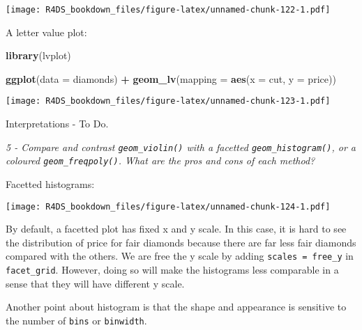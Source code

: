 \documentclass[]{article}
\newenvironment{Shaded}{\begin{snugshade}}{\end{snugshade}}
\newcommand{\KeywordTok}[1]{\textcolor[rgb]{0.13,0.29,0.53}{\textbf{#1}}}
\newcommand{\DataTypeTok}[1]{\textcolor[rgb]{0.13,0.29,0.53}{#1}}
\newcommand{\DecValTok}[1]{\textcolor[rgb]{0.00,0.00,0.81}{#1}}
\newcommand{\StringTok}[1]{\textcolor[rgb]{0.31,0.60,0.02}{#1}}
\newcommand{\OperatorTok}[1]{\textcolor[rgb]{0.81,0.36,0.00}{\textbf{#1}}}
\newcommand{\NormalTok}[1]{#1}
\theoremstyle{definition}
\theoremstyle{definition}
\theoremstyle{definition}
\theoremstyle{remark}
\begin{document}
\texttt{[image: R4DS\_bookdown\_files/figure-latex/unnamed-chunk-122-1.pdf]}

A letter value plot:

\begin{Shaded}
\begin{Highlighting}[]
\KeywordTok{library}\NormalTok{(lvplot)}

\KeywordTok{ggplot}\NormalTok{(}\DataTypeTok{data =}\NormalTok{ diamonds) }\OperatorTok{+}
\StringTok{  }\KeywordTok{geom_lv}\NormalTok{(}\DataTypeTok{mapping =} \KeywordTok{aes}\NormalTok{(}\DataTypeTok{x =}\NormalTok{ cut, }\DataTypeTok{y =}\NormalTok{ price))}
\end{Highlighting}
\end{Shaded}

\texttt{[image: R4DS\_bookdown\_files/figure-latex/unnamed-chunk-123-1.pdf]}

Interpretations - To Do.

\emph{5 - Compare and contrast \texttt{geom\_violin()} with a facetted
\texttt{geom\_histogram()}, or a coloured \texttt{geom\_freqpoly()}.
What are the pros and cons of each method?}

Facetted histograms:

\begin{Shaded}
\end{Shaded}

\texttt{[image: R4DS\_bookdown\_files/figure-latex/unnamed-chunk-124-1.pdf]}

By default, a facetted plot has fixed x and y scale. In this case, it is
hard to see the distribution of price for fair diamonds because there
are far less fair diamonds compared with the others. We are free the y
scale by adding
\texttt{scales\ =\ \textquotesingle{}free\_y\textquotesingle{}} in
\texttt{facet\_grid}. However, doing so will make the histograms less
comparable in a sense that they will have different y scale.

Another point about histogram is that the shape and appearance is
sensitive to the number of \texttt{bins} or \texttt{binwidth}.
\end{document}
